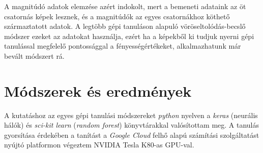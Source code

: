 \documentclass[12pt,letterpaper,oneside,openright]{book}
\begin{document}
 \newline\indent
 A magnitúdó adatok elemzése azért indokolt, mert a bemeneti adataink az öt csatornás képek lesznek, és a magnitúdók az egyes csatornákhoz köthető származtatott adatok. A legtöbb gépi tanuláson alapuló vöröseltolódás-becslő módszer ezeket az adatokat használja, ezért ha a képekből ki tudjuk nyerni gépi tanulással megfelelő pontossággal a fényességértékeket, alkalmazhatunk már bevált módszert rá.
 
 
 \chapter{Módszerek és eredmények}
 A kutatáshoz az egyes gépi tanulási módszereket \textit{python} nyelven a \textit{keras} (neurális hálók) és \textit{sci-kit learn} (\textit{random forest}) könyvtárakkal valósítottam meg. A tanulás gyorsítása érdekében a tanítást a \textit{Google Cloud} felhő alapú számítási szolgáltatást nyújtó platformon végeztem NVIDIA Tesla K80-as GPU-val.
 
 
\end{document}
